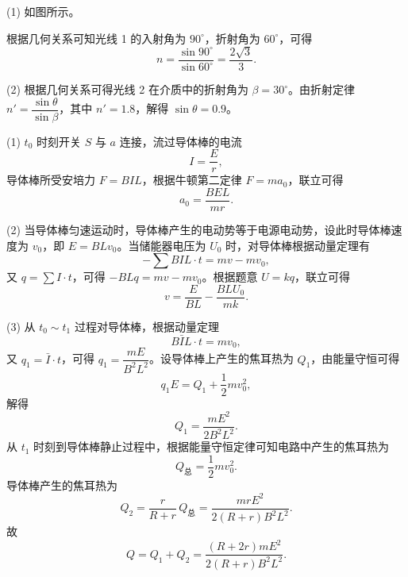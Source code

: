 \begin{answer}
(1) 如图所示。


根据几何关系可知光线 1 的入射角为 $90^{\circ}$，折射角为 $60^{\circ}$，可得
\[
  n=\frac{\sin90^{\circ}}{\sin60^{\circ}}=\frac{2\sqrt{3}}{3}.
\]

(2) 根据几何关系可得光线 2 在介质中的折射角为 $\beta=30^{\circ}$。由折射定律 $n'=\dfrac{\sin\theta}{\sin\beta}$，其中 $n'=1.8$，解得 $\sin\theta=0.9$。
\end{answer}

\begin{answer}
(1) $t_{0}$ 时刻开关 $S$ 与 $a$ 连接，流过导体棒的电流
\[
  I=\frac{E}{r},
\]
导体棒所受安培力 $F=BIL$，根据牛顿第二定律 $F=ma_{0}$，联立可得
\[
  a_{0}=\frac{BEL}{mr}.
\]

(2) 当导体棒匀速运动时，导体棒产生的电动势等于电源电动势，设此时导体棒速度为 $v_{0}$，即 $E=BLv_{0}$。当储能器电压为 $U_{0}$ 时，对导体棒根据动量定理有
\[
  -\sum BIL\cdot t=mv-mv_{0},
\]
又 $q=\sum I\cdot t$，可得 $-BLq=mv-mv_{0}$。根据题意 $U=kq$，联立可得
\[
  v=\frac{E}{BL}-\frac{BLU_{0}}{mk}.
\]

(3) 从 $t_{0}\sim t_{1}$ 过程对导体棒，根据动量定理
\[
  B\bar{I}L\cdot t=mv_{0},
\]
又 $q_{1}=\bar{I}\cdot t$，可得 $q_{1}=\dfrac{mE}{B^{2}L^{2}}$。设导体棒上产生的焦耳热为 $Q_{1}$，由能量守恒可得
\[
  q_{1}E=Q_{1}+\frac{1}{2}mv_{0}^{2},
\]
解得
\[
  Q_{1}=\frac{mE^{2}}{2B^{2}L^{2}}.
\]
从 $t_{1}$ 时刻到导体棒静止过程中，根据能量守恒定律可知电路中产生的焦耳热为
\[
  Q_{\text{总}}=\frac{1}{2}mv_{0}^{2}.
\]
导体棒产生的焦耳热为
\[
  Q_{2}=\frac{r}{R+r}\,Q_{\text{总}}
       =\frac{mrE^{2}}{2(R+r)B^{2}L^{2}}.
\]
故
\[
  Q=Q_{1}+Q_{2}
   =\frac{(R+2r)mE^{2}}{2(R+r)B^{2}L^{2}}.
\]
\end{answer}

